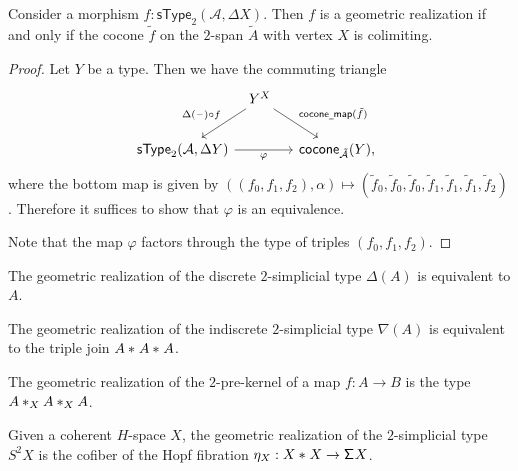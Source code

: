 \begin{thm}
Consider a morphism $f:\mathsf{sType}_2(\mathcal{A},\Delta X)$. Then $f$ is a geometric realization if and only if the cocone $\tilde{f}$ on the $2$-span $\tilde{A}$ with vertex $X$ is colimiting.
\end{thm}

\begin{proof}
Let $Y$ be a type. Then we have the commuting triangle
\begin{equation*}
\begin{tikzcd}[column sep=tiny]
\phantom{\mathsf{cocone}_{\tilde{\mathcal{A}}}(Y)} & Y^X \arrow[dl,swap,"\Delta(\blank)\circ f"] \arrow[dr,"\mathsf{cocone\usc{}map}(\tilde{f})"] & \phantom{\mathsf{sType}_2(\mathcal{A},\Delta Y)} \\
\mathsf{sType}_2(\mathcal{A},\Delta Y) \arrow[rr,swap,"\varphi"] & & \mathsf{cocone}_{\tilde{\mathcal{A}}}(Y),
\end{tikzcd}
\end{equation*}
where the bottom map is given by $((f_0,f_1,f_2),\alpha)\mapsto (\tilde f_0,\tilde f_0,\tilde f_0,\tilde f_1,\tilde f_1,\tilde f_1,\tilde f_2)$. Therefore it suffices to show that $\varphi$ is an equivalence.

Note that the map $\varphi$ factors through the type of triples $(f_0,f_1,f_2)$.
\end{proof}

\begin{cor}
The geometric realization of the discrete $2$-simplicial type $\Delta(A)$ is equivalent to $A$.
\end{cor}

\begin{cor}
The geometric realization of the indiscrete $2$-simplicial type $\nabla(A)$ is equivalent to the triple join $\join{A}{\join{A}{A}}$. 
\end{cor}

\begin{cor}\label{cor:2-pre-kernel}
The geometric realization of the $2$-pre-kernel of a map $f:A\to B$ is the type $\join[X]{A}{\join[X]{A}{A}}$. 
\end{cor}

\begin{cor}\label{cor:geom_hspace}
Given a coherent $H$-space $X$, the geometric realization of the $2$-simplicial type $S^2 X$ is the cofiber of the Hopf fibration $\eta_X: \join{X}{X} \to \susp X$.
\end{cor}

